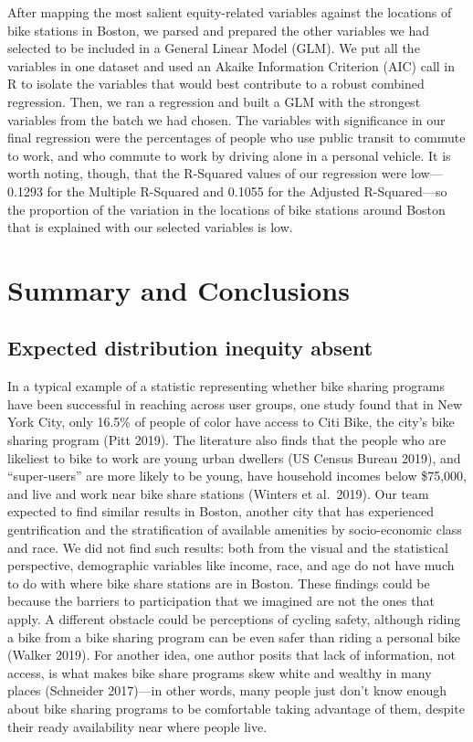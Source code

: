 \documentclass[
  12pt,
]{article}
\begin{document}
After mapping the most salient equity-related variables against the
locations of bike stations in Boston, we parsed and prepared the other
variables we had selected to be included in a General Linear Model
(GLM). We put all the variables in one dataset and used an Akaike
Information Criterion (AIC) call in R to isolate the variables that
would best contribute to a robust combined regression. Then, we ran a
regression and built a GLM with the strongest variables from the batch
we had chosen. The variables with significance in our final regression
were the percentages of people who use public transit to commute to
work, and who commute to work by driving alone in a personal vehicle. It
is worth noting, though, that the R-Squared values of our regression
were low---0.1293 for the Multiple R-Squared and 0.1055 for the Adjusted
R-Squared---so the proportion of the variation in the locations of bike
stations around Boston that is explained with our selected variables is
low.

\newpage

\hypertarget{summary-and-conclusions}{%
\section{Summary and Conclusions}\label{summary-and-conclusions}}

\hypertarget{expected-distribution-inequity-absent}{%
\subsection{Expected distribution inequity
absent}\label{expected-distribution-inequity-absent}}

In a typical example of a statistic representing whether bike sharing
programs have been successful in reaching across user groups, one study
found that in New York City, only 16.5\% of people of color have access
to Citi Bike, the city's bike sharing program (Pitt 2019). The
literature also finds that the people who are likeliest to bike to work
are young urban dwellers (US Census Bureau 2019), and ``super-users''
are more likely to be young, have household incomes below \$75,000, and
live and work near bike share stations (Winters et al.~2019). Our team
expected to find similar results in Boston, another city that has
experienced gentrification and the stratification of available amenities
by socio-economic class and race. We did not find such results: both
from the visual and the statistical perspective, demographic variables
like income, race, and age do not have much to do with where bike share
stations are in Boston. These findings could be because the barriers to
participation that we imagined are not the ones that apply. A different
obstacle could be perceptions of cycling safety, although riding a bike
from a bike sharing program can be even safer than riding a personal
bike (Walker 2019). For another idea, one author posits that lack of
information, not access, is what makes bike share programs skew white
and wealthy in many places (Schneider 2017)---in other words, many
people just don't know enough about bike sharing programs to be
comfortable taking advantage of them, despite their ready availability
near where people live.
\end{document}
